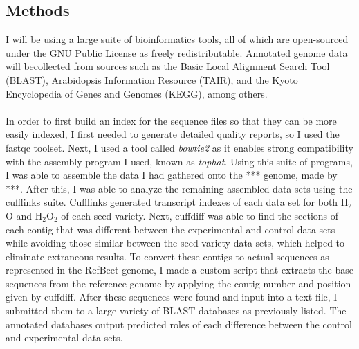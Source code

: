 \documentclass{article}
\begin{document}
	\subsection{Methods}
	I will be using a large suite of bioinformatics tools, all of which are open-sourced under the GNU Public License as freely redistributable. Annotated genome data will becollected from sources such as the Basic Local Alignment Search Tool (BLAST), Arabidopsis Information Resource (TAIR), and the Kyoto Encyclopedia of Genes and Genomes (KEGG), among others.\\\\
	In order to first build an index for the sequence files so that they can be more easily indexed, I first needed to generate detailed quality reports, so I used the fastqc toolset. Next, I used a tool called \emph{bowtie2} as it enables strong compatibility with the assembly program I used, known as \emph{tophat}. Using this suite of programs, I was able to assemble the data I had gathered onto the *** genome, made by ***. After this, I was able to analyze the remaining assembled data sets using the cufflinks suite. Cufflinks generated transcript indexes of each data set for both H$_{2}$O and H$_{2}$O$_{2}$ of each seed variety. Next, cuffdiff was able to find the sections of each contig that was different between the experimental and control data sets while avoiding those similar between the seed variety data sets, which helped to eliminate extraneous results. To convert these contigs to actual sequences as represented in the RefBeet genome, I made a custom script that extracts the base sequences from the reference genome by applying the contig number and position given by cuffdiff. After these sequences were found and input into a text file, I submitted them to a large variety of BLAST databases as previously listed. The annotated databases output predicted roles of each difference between the control and experimental data sets.
\end{document}
